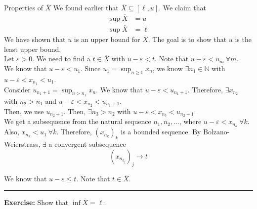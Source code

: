 \documentclass[8pt]{extarticle}
\newcommand{\N}{\mathbb{N}}
\begin{document}
  \begin{problem}{Properties of $\overline{X}$}
    We found earlier that $\overline{X} \subseteq [\ell,u]$. We claim that
    \begin{align*}
      \sup \overline{X} &= u\\
      \sup\overline{X} &= \ell
    \end{align*}
    \tcblower
    We have shown that $u$ is an upper bound for $\overline{X}$. The goal is to show that $u$ is the least upper bound.\\

    Let $\varepsilon > 0$. We need to find a $t\in\overline{X}$ with $u-\varepsilon < t$. Note that $u-\varepsilon < u_m~\forall m$.\\

    We know that $u-\varepsilon < u_1$. Since $u_1 = \sup_{n\geq 1}x_n$, we know $\exists n_1\in\N$ with $u-\varepsilon < x_{n_1} < u_1$.\\

    Consider $u_{n_1+1} = \sup_{n > n_1}x_n$. We know that $u-\varepsilon < u_{n_1 + 1}$. Therefore, $\exists x_{n_2}$ with $n_2 > n_1$ and $u-\varepsilon < x_{n_2} < u_{n_1 + 1}$.\\

    Then, we use $u_{n_2 + 1}$. Then, $\exists n_3 > n_2$ with $u-\varepsilon < x_{n_3} < u_{n_2 + 1}$.\\

    We get a subsequence from the natural sequence $n_1,n_2,\dots$, where $u - \varepsilon < x_{n_k}~\forall k$.\\

    Also, $x_{n_k} < u_1~\forall k$. Therefore, $(x_{n_k})_k$ is a bounded sequence. By Bolzano-Weierstrass, $\exists$ a convergent subsequence \[\left(x_{n_{k_j}}\right)_j \rightarrow t\]

    We know that $u-\varepsilon \leq t$. Note that $t\in\overline{X}$.\\
    \vspace{4pt}
    \rule{\textwidth}{0.4pt}
    \vspace{4pt}
    \textbf{Exercise:} Show that $\inf\overline{X} = \ell$.
  \end{problem}
\end{document}
